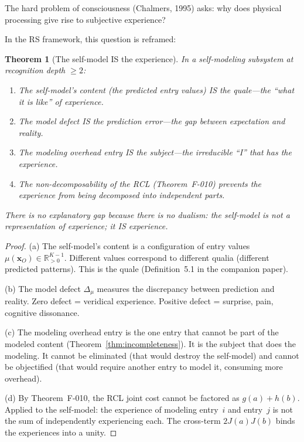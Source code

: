 \documentclass[11pt,a4paper]{article}
\theoremstyle{plain}
\newtheorem{theorem}{Theorem}[section]
\theoremstyle{definition}
\theoremstyle{remark}
\newcommand{\Rp}{\mathbb{R}_{>0}}
\newcommand{\Jcost}{J}
\begin{document}
The hard problem of consciousness (Chalmers, 1995) asks: why does
physical processing give rise to subjective experience?

In the RS framework, this question is reframed:

\begin{theorem}[The self-model IS the experience]
\label{thm:hard-problem}
In a self-modeling subsystem at recognition depth $\geq 2$:
\begin{enumerate}[nosep,label=(\alph*)]
\item The self-model's content (the predicted entry values) IS the
  quale---the ``what it is like'' of experience.
\item The model defect IS the prediction error---the gap between
  expectation and reality.
\item The modeling overhead entry IS the subject---the irreducible ``I''
  that has the experience.
\item The non-decomposability of the RCL (Theorem~F-010) prevents the
  experience from being decomposed into independent parts.
\end{enumerate}
There is no explanatory gap because there is no dualism: the self-model
is not a \emph{representation of} experience; it IS experience.
\end{theorem}

\begin{proof}
(a) The self-model's content is a configuration of entry values
$\mu(\mathbf{x}_O) \in \Rp^{K-1}$.  Different values correspond to
different qualia (different predicted patterns).  This is the quale
(Definition~5.1 in the companion paper).

(b) The model defect $\Delta_\mu$ measures the discrepancy between
prediction and reality.  Zero defect = veridical experience.  Positive
defect = surprise, pain, cognitive dissonance.

(c) The modeling overhead entry is the one entry that cannot be part of
the modeled content (Theorem~\ref{thm:incompleteness}).  It is the
subject that does the modeling.  It cannot be eliminated (that would
destroy the self-model) and cannot be objectified (that would require
another entry to model it, consuming more overhead).

(d) By Theorem~F-010, the RCL joint cost cannot be factored as
$g(a) + h(b)$.  Applied to the self-model: the experience of modeling
entry~$i$ and entry~$j$ is not the sum of independently experiencing
each.  The cross-term $2\Jcost(a)\Jcost(b)$ binds the experiences into
a unity.
\end{proof}
\end{document}
